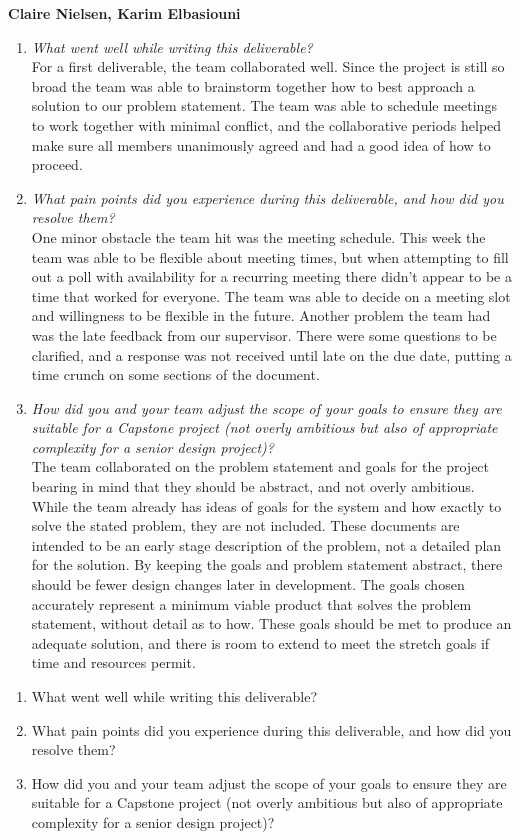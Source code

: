 \documentclass{article}
\begin{document}
\textbf{Claire Nielsen, Karim Elbasiouni}
\begin{enumerate}
    \item \textit{What went well while writing this deliverable?}\\
    For a first deliverable, the team collaborated well. Since the project is still so broad the team was able to brainstorm together how to best approach a solution to our problem statement. The team was able to schedule meetings to work together with minimal conflict, and the collaborative periods helped make sure all members unanimously agreed and had a good idea of how to proceed. 
    \item \textit{What pain points did you experience during this deliverable, and how did you resolve them?}\\
    One minor obstacle the team hit was the meeting schedule. This week the team was able to be flexible about meeting times, but when attempting to fill out a poll with availability for a recurring meeting there didn’t appear to be a time that worked for everyone. The team was able to decide on a meeting slot and willingness to be flexible in the future. Another problem the team had was the late feedback from our supervisor. There were some questions to be clarified, and a response was not received until late on the due date, putting a time crunch on some sections of the document. 
    \item \textit{How did you and your team adjust the scope of your goals to ensure they are suitable for a Capstone project (not overly ambitious but also of appropriate complexity for a senior design project)?}\\
    The team collaborated on the problem statement and goals for the project bearing in mind that they should be abstract, and not overly ambitious. While the team already has ideas of goals for the system and how exactly to solve the stated problem, they are not included. These documents are intended to be an early stage description of the problem, not a detailed plan for the solution. By keeping the goals and problem statement abstract, there should be fewer design changes later in development. The goals chosen accurately represent a minimum viable product that solves the problem statement, without detail as to how. These goals should be met to produce an adequate solution, and there is room to extend to meet the stretch goals if time and resources permit.
\end{enumerate}

\begin{enumerate}
    \item What went well while writing this deliverable? 
    \item What pain points did you experience during this deliverable, and how
    did you resolve them?
    \item How did you and your team adjust the scope of your goals to ensure
    they are suitable for a Capstone project (not overly ambitious but also of
    appropriate complexity for a senior design project)?
\end{enumerate}  
\end{document}
